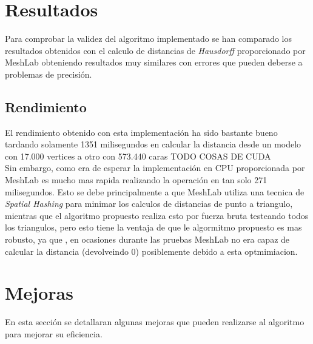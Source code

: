 \documentclass[10pt,oneside,a4paper]{article}
\begin{document}
\section{Resultados}
Para comprobar la validez del algoritmo implementado se han comparado los resultados obtenidos con el calculo de distancias de \textit{Hausdorff} proporcionado por MeshLab obteniendo resultados muy similares con errores que pueden deberse a problemas de precisión.
\subsection{Rendimiento}
El rendimiento obtenido con esta implementación ha sido bastante bueno tardando solamente 1351 milisegundos en calcular la distancia desde un modelo con 17.000 vertices  a otro con 573.440 caras TODO COSAS DE CUDA\\

Sin embargo, como era de esperar la implementación en CPU proporcionada por MeshLab es mucho mas rapida realizando la operación en tan solo 271 milisegundos. Esto se debe principalmente a que MeshLab utiliza una tecnica de \textit{Spatial Hashing} para minimar los calculos de distancias de punto a triangulo, mientras que el algoritmo propuesto realiza esto por fuerza bruta testeando todos los triangulos, pero esto tiene la ventaja de que le algormitmo propuesto es mas robusto, ya que , en ocasiones durante las pruebas MeshLab no era capaz de calcular la distancia (devolveindo 0) posiblemente debido a esta optmimiacion.

\section{Mejoras}
En esta sección se detallaran algunas mejoras que pueden realizarse al algoritmo para mejorar su eficiencia.\\
\end{document}
